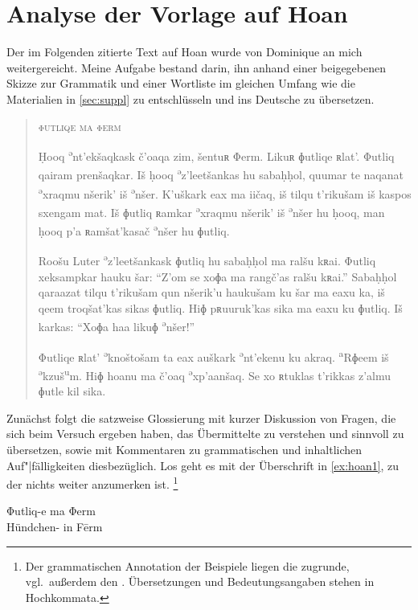 \documentclass[
	12pt,
	ngerman,
]{scrartcl}
\newcommand{\wdef}[1]{{\setquotestyle{wdef}\enquote{#1}}}
\newcommand{\tit}[1]{\textit{#1}} %
\newcommand{\tsup}[1]{\textsuperscript{#1}} %
\begin{document}
\section{Analyse der Vorlage auf Hoan}
\label{sec:hoanalys}

Der im Folgenden zitierte Text auf Hoan wurde von Dominique an mich
weitergereicht. Meine Aufgabe bestand darin, ihn anhand einer beigegebenen
Skizze zur Grammatik und einer Wortliste im gleichen Umfang wie die Materialien
in \cref{sec:suppl} zu entschlüsseln und ins Deutsche zu übersetzen.

\begin{quote}
\textsc{\MakeLowercase{Φutliqe ma Φerm}}

Ḥooq \tsup{ə}nt’ekšaqkask č'oaqa zim, šentuʀ Φerm. Likuʀ ɸutliqe ʀlat'. Φutliq
qairam prenšaqkar. Iš ḥooq \tsup{ə}z'leetšankas hu sabaḥḥol, quumar te naqanat
\tsup{ə}xraqmu nšerik' iš \tsup{ə}nšer. K'uškark eax ma iičaq, iš tilqu
t'rikušam iš kaspos sxengam mat. Iš ɸutliq ʀamkar \tsup{ə}xraqmu nšerik' iš
\tsup{ə}nšer hu ḥooq, man ḥooq p'a ʀamšat'kasač \tsup{ə}nšer hu ɸutliq.

Roošu Luter \tsup{ə}z'leetšankask ɸutliq hu sabaḥḥol ma ralšu kʀai. Φutliq
xeksampkar hauku šar: \enquote{Z'om se xoɸa ma rangč'as ralšu kʀai.} Sabaḥḥol
qaraazat tilqu t'rikušam qun nšerik'u haukušam ku šar ma eaxu ka, iš qeem
troqšat'kas sikas ɸutliq. Hiɸ pʀuuruk'kas sika ma eaxu ku ɸutliq. Iš karkas:
\enquote{Xoɸa haa likuɸ \tsup{ə}nšer!}

Φutliqe ʀlat' \tsup{ə}knoštošam ta eax auškark \tsup{ə}nt'ekenu ku akraq.
\tsup{a}Rɸeem iš \tsup{ə}kzuš\tsup{u}m. Hiɸ hoanu ma č'oaq \tsup{ə}xp'aanšaq.
Se xo ʀtuklas t'rikkas z'almu ɸutle kil sika.
\end{quote}

Zunächst folgt die satzweise Glossierung mit kurzer Diskussion von Fragen, die
sich beim Versuch ergeben haben, das Übermittelte zu verstehen und sinnvoll zu
übersetzen, sowie mit Kommentaren zu grammatischen und inhaltlichen
Auf"|fälligkeiten diesbezüglich. Los geht es mit der Überschrift in
\cref{ex:hoan1}, zu der nichts weiter anzumerken ist.%
%
	\footnote{Der grammatischen Annotation der Beispiele liegen die
	\tit{} \autocite{lgr} zugrunde, vgl.~außerdem den
	 \tit{}. Übersetzungen und
	Bedeutungsangaben stehen in Hochkommata.}

\begin{exe}
\ex \label{ex:hoan1}
	\gll Φutliq-e ma Φerm \\
		Hündchen- in Fērm \\
	\trans \wdef{Das Hündchen zu Fērm}
\end{exe}
\end{document}
